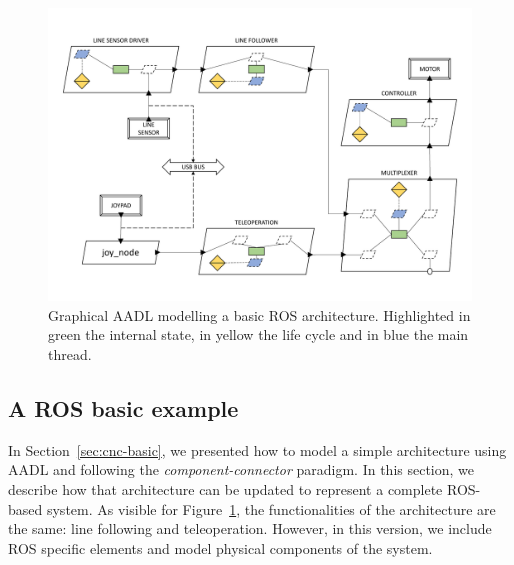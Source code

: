 \begin{landscape}
	\begin{figure}[t]
	\centering
	\includegraphics[height=0.88\textwidth]{gfx/arch_figures-15}
	\caption[Graphical AADL modelling a basic ROS architecture.]{Graphical AADL modelling a basic ROS architecture. Highlighted in green the internal state, in yellow the life cycle and in blue the main thread.}
	\label{fig:ros-arch}
	\end{figure}
\end{landscape}

\subsection{A ROS basic example}
In Section~\ref{sec:cnc-basic}, we presented how to model a simple architecture using AADL and following the \textit{component-connector} paradigm. In this section, we describe how that architecture can be updated to represent a complete ROS-based system. As visible for Figure~\ref{fig:ros-arch}, the functionalities of the architecture are the same: line following and teleoperation. However, in this version, we include ROS specific elements and model physical components of the system.

